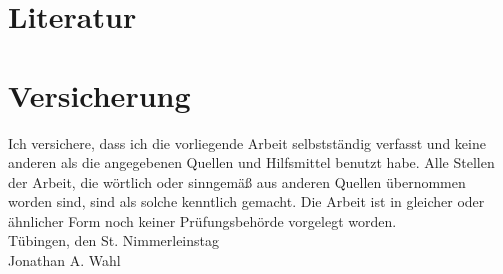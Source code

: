 \documentclass[12pt,oneside,a4paper]{scrreprt}
\begin{document}
\section{Literatur}
\printbibliography[keyword=Quelle,heading=quelle] 
\printbibliography[keyword=Kommentar,heading=kommentar]
\printbibliography[keyword=Lexikon,heading=lexikon]
\printbibliography[notkeyword=Quelle,notkeyword=Lexikon,notkeyword=Kommentar,heading=lit] 


\newpage
\section{Versicherung}
\normalsize
\noindent Ich versichere, dass ich die vorliegende Arbeit selbstständig verfasst und keine anderen als die angegebenen Quellen und Hilfsmittel benutzt habe. Alle Stellen der Arbeit, die wörtlich oder sinngemäß aus anderen Quellen übernommen worden sind, sind als solche kenntlich gemacht. Die Arbeit ist in gleicher oder ähnlicher Form noch keiner Prüfungsbehörde vorgelegt worden.\\%

\noindent
Tübingen, den St. Nimmerleinstag\\[4ex]

\noindent Jonathan A. Wahl
\end{document}
